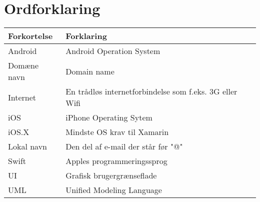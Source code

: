 \chapter*{Ordforklaring}

\begin{tabularx}{\textwidth}{l l X} \hline
	\textbf{Forkortelse}  & \textbf{Forklaring} \\ \hline
	Android& Android Operation System& \\
	Domæne navn& Domain name\cite{DM}\\
	Internet& En trådløs internetforbindelse som f.eks. 3G eller Wifi& \\
	iOS&  iPhone Operating Sytem& \\
	iOS.X& Mindste OS krav til Xamarin \\
	Lokal navn& Den del af e-mail der står før "@"\\
	Swift& Apples programmeringssprog& \\
	UI& Grafisk brugergrænseflade& \\
	UML& Unified Modeling Language& \\
\end{tabularx}